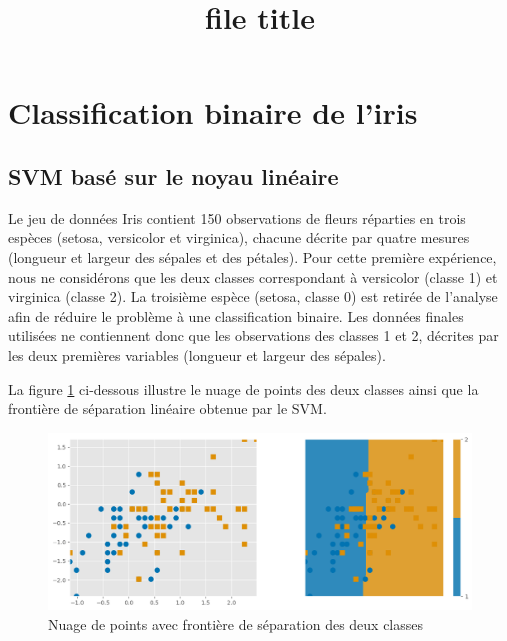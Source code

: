 \documentclass{rapport}
\title{file title}
\begin{document}

\subject{} 



\buildmargins
\renewcommand{\reportname}{Support vecteurs machines}
\buildcover 
\toc 



\newpage



\section{Classification binaire de l’iris }

\subsection{SVM basé sur le noyau linéaire}
Le jeu de données Iris contient 150 observations de fleurs réparties en trois espèces (setosa, versicolor et virginica), chacune décrite par quatre mesures (longueur et largeur des sépales et des pétales). Pour cette première expérience, nous ne considérons que les deux classes correspondant à versicolor (classe 1) et virginica (classe 2). La troisième espèce (setosa, classe 0) est retirée de l’analyse afin de réduire le problème à une classification binaire. Les données finales utilisées ne contiennent donc que les observations des classes 1 et 2, décrites par les deux premières variables (longueur et largeur des sépales). 

La figure \ref{fig:placeholder1} ci-dessous illustre le nuage de points des deux classes ainsi que la frontière de séparation linéaire obtenue par le SVM.

\begin{figure}[H]
    \centering
    \includegraphics[width=0.9\linewidth]{nuageiris.png}
    \caption{Nuage de points avec frontière de séparation des deux classes}
    \label{fig:placeholder1}
\end{figure}
\end{document}
